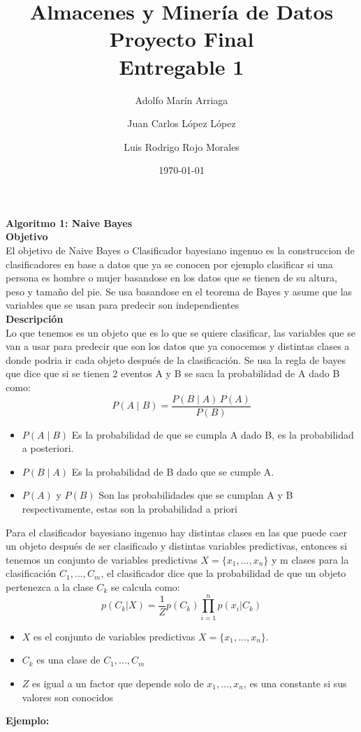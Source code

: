 \documentclass{article}
\title{Almacenes y Minería de Datos \\Proyecto Final\\ Entregable 1}
\author{Adolfo Marín Arriaga \and Juan Carlos López López \and Luis Rodrigo Rojo Morales}
\date{\today\\}
\begin{document}
 \maketitle
 
 {\bf Algoritmo 1: Naive Bayes}\\
 
 {\bf Objetivo}\\
 
 El objetivo de Naive Bayes o Clasificador bayesiano ingenuo es la construccion de clasificadores en base a datos que ya se conocen por ejemplo clasificar si una persona es hombre o mujer basandose
 en los datos que se tienen de su altura, peso y tamaño del pie. Se usa basandose en el teorema de Bayes y asume que las variables que se usan para predecir son 
 independientes\\
 
 {\bf Descripción}\\
 
 Lo que tenemos es un objeto que es lo que se quiere clasificar, las variables que se van a usar para predecir que son los datos que ya conocemos y distintas clases a donde podria 
 ir cada objeto después de la clasificación. Se usa la regla de bayes que dice que si se tienen 2 eventos A y B se saca la probabilidad de A dado B como:
 $$ P(A \mid B) = \frac{P(B \mid A) \, P(A)}{P(B)} $$
 \begin{itemize}
  \item $P(A \mid B)$ Es la probabilidad de que se cumpla  A dado B, es la probabilidad a posteriori.
  \item $P(B \mid A)$ Es la probabilidad de B dado que se cumple A.
  \item $P(A)$ y $P(B)$ Son las probabilidades que se cumplan A y B respectivamente, estas son la probabilidad a priori
 \end{itemize}
 Para el clasificador bayesiano ingenuo hay distintas clases en las que puede caer un objeto después de ser clasificado y distintas variables predictivas, entonces
 si tenemos un conjunto de variables predictivas $X=\{x_1,...,x_n\}$ y m clases para la clasificación $C_1,...,C_m$, el clasificador dice que la 
 probabilidad de que un objeto pertenezca a la clase $C_k$ se calcula como:
 \begin{equation*}
 p(C_k|X)=\frac{1}{Z}p(C_k)\prod_{i=1}^{n}p(x_i|C_k)
 \end{equation*}
 \begin{itemize}
  \item $X$ es el conjunto de variables predictivas $X=\{x_1,...,x_n\}$.
  \item $C_k$ es una clase de $C_1,...,C_m$
  \item $Z$ es igual a un factor que depende solo de $x_1,...,x_n$, es una constante si sus valores son conocidos
 
 \end{itemize}
{\bf Ejemplo:}\\
 
\end{document}

